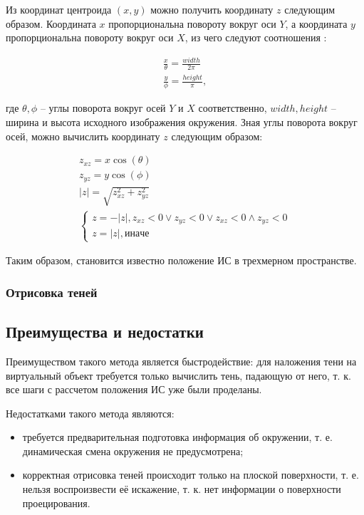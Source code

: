 Из координат центроида $(x, y)$ можно получить координату $z$ следующим образом. Координата $x$ пропорциональна повороту вокруг оси $Y$, а координата $y$ пропорциональна повороту вокруг оси $X$, из чего следуют соотношения \cite{rtsm}:

\begin{equation}
	\begin{split}
		\frac{x}{\theta} = \frac{width}{2\pi} \\
		\frac{y}{\phi} = \frac{height}{\pi},
	\end{split}
\end{equation}

где $\theta, \phi$ -- углы поворота вокруг осей $Y$ и $X$ соответственно, $width, height$ -- ширина и высота исходного изображения окружения. Зная углы поворота вокруг осей, можно вычислить координату $z$ следующим образом:

\begin{equation}
	\begin{split}
		z_{xz} = x\cos(\theta) \\
		z_{yz} = y\cos(\phi) \\
		|z| = \sqrt{z_{xz} ^ 2 + z_{yz} ^ 2} \\
		\begin{cases}
			z = -|z|, z_{xz} < 0 \vee z_{yz} < 0 \vee z_{xz} < 0 \wedge z_{yz} < 0 \\
			z = |z|, иначе
		\end{cases}
	\end{split}
\end{equation}

Таким образом, становится известно положение ИС в трехмерном пространстве.

\subsubsection*{Отрисовка теней}



\subsection*{Преимущества и недостатки}

Преимуществом такого метода является быстродействие: для наложения тени на виртуальный объект требуется только вычислить тень, падающую от него, т. к. все шаги с рассчетом положения ИС уже были проделаны.

Недостатками такого метода являются:
\begin{itemize}
	\item требуется предварительная подготовка информация об окружении, т. е. динамическая смена окружения не предусмотрена;
	\item корректная отрисовка теней происходит только на плоской поверхности, т. е. нельзя воспроизвести её искажение, т. к. нет информации о поверхности проецирования.
\end{itemize}

